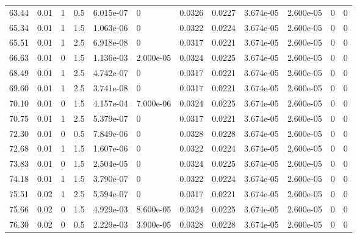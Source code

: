 \documentclass[preview]{standalone}
\begin{document}
{{{\begin{tabular}{L{1.2cm}C{1.2cm} C{0.3cm}C{0.5cm} C{1.4cm}C{1.4cm} C{1.4cm}C{1.4cm} C{1.6cm}C{1.6cm} C{1.6cm}C{1.6cm}}
  63.44  &  0.01  & 1     & 0.5 &  6.015e-07  & 0  &  0.0326&   0.0227& 3.674e-05 & 2.600e-05   &  0 & 0  \\ 
  65.34  &  0.01  & 1     & 1.5 &  1.063e-06  & 0  &  0.0322&   0.0224& 3.674e-05 & 2.600e-05   &  0 & 0  \\ 
  65.51  &  0.01  & 1     & 2.5 &  6.918e-08  & 0  &  0.0317&   0.0221& 3.674e-05 & 2.600e-05   &  0 & 0  \\ 
  66.63  &  0.01  & 0     & 1.5 &  1.136e-03  & 2.000e-05  &  0.0324&   0.0225& 3.674e-05 & 2.600e-05   &  0 & 0  \\ 
  68.49  &  0.01  & 1     & 2.5 &  4.742e-07  & 0  &  0.0317&   0.0221& 3.674e-05 & 2.600e-05   &  0 & 0  \\ 
  69.60  &  0.01  & 1     & 2.5 &  3.741e-08  & 0  &  0.0317&   0.0221& 3.674e-05 & 2.600e-05   &  0 & 0  \\ 
  70.10  &  0.01  & 0     & 1.5 &  4.157e-04  & 7.000e-06  &  0.0324&   0.0225& 3.674e-05 & 2.600e-05   &  0 & 0  \\ 
  70.75  &  0.01  & 1     & 2.5 &  5.379e-07  & 0  &  0.0317&   0.0221& 3.674e-05 & 2.600e-05   &  0 & 0  \\ 
  72.30  &  0.01  & 0     & 0.5 &  7.849e-06  & 0  &  0.0328&   0.0228& 3.674e-05 & 2.600e-05   &  0 & 0  \\ 
  72.68  &  0.01  & 1     & 1.5 &  1.607e-06  & 0  &  0.0322&   0.0224& 3.674e-05 & 2.600e-05   &  0 & 0  \\ 
  73.83  &  0.01  & 0     & 1.5 &  2.504e-05  & 0  &  0.0324&   0.0225& 3.674e-05 & 2.600e-05   &  0 & 0  \\ 
  74.18  &  0.01  & 1     & 1.5 &  3.790e-07  & 0  &  0.0322&   0.0224& 3.674e-05 & 2.600e-05   &  0 & 0  \\ 
  75.51  &  0.02  & 1     & 2.5 &  5.594e-07  & 0  &  0.0317&   0.0221& 3.674e-05 & 2.600e-05   &  0 & 0  \\ 
  75.66  &  0.02  & 0     & 1.5 &  4.929e-03  & 8.600e-05  &  0.0324&   0.0225& 3.674e-05 & 2.600e-05   &  0 & 0  \\ 
  76.30  &  0.02  & 0     & 0.5 &  2.229e-03  & 3.900e-05  &  0.0328&   0.0228& 3.674e-05 & 2.600e-05   &  0 & 0  \\ 
\hline 
\end{tabular} 

}}}
\end{document}
